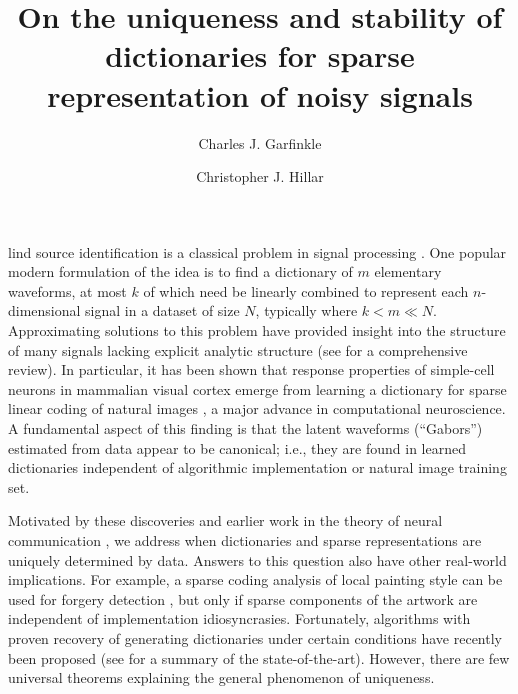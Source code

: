\documentclass[9pt,twocolumn]{pnas-new}
\title{On the uniqueness and stability of dictionaries for sparse representation of noisy signals}
\author[a,1]{Charles J. Garfinkle}
\author[a,1]{Christopher J. Hillar}
\affil[a]{Redwood Center for Theoretical Neuroscience, Berkeley, CA, USA}
\begin{document}
\verticaladjustment{-2pt}

\maketitle
\thispagestyle{firststyle}

lind source identification is a classical problem in signal processing \cite{sato1975method}.  
One popular modern formulation of the idea is to find a dictionary of $m$ elementary waveforms, at most $k$ of which need be linearly combined to represent each $n$-dimensional signal in a dataset of size $N$, typically where $k < m \ll N$.  Approximating solutions to this problem have
provided insight into the structure of many signals lacking explicit analytic structure (see \cite{Zhang15} for a comprehensive review). 
In particular, it has been shown that response properties of simple-cell neurons in mammalian visual cortex emerge from learning a dictionary for sparse linear coding of natural images \cite{Olshausen96, hurri1996image, bell1997independent, van1998independent}, a major advance in computational neuroscience. A fundamental aspect of this finding is that the latent waveforms (``Gabors'') estimated from data appear to be canonical; i.e., they are found in learned dictionaries independent of algorithmic implementation or natural image training set.


Motivated by these discoveries and earlier work in the theory of neural communication \cite{Coulter10, Isely10}, we address when dictionaries and sparse representations are uniquely determined by data.  Answers to this question also have other real-world implications.  For example, a sparse coding analysis of local painting style can be used for forgery detection \cite{hughes2010, Olshausen10}, but only if sparse components of the artwork are independent of implementation idiosyncrasies. Fortunately, algorithms with proven recovery of generating dictionaries under certain 
conditions have recently been proposed (see \cite[Sec.~I-E]{Sun16} for a summary of the state-of-the-art).  However, there are few universal theorems explaining the general phenomenon of uniqueness.  
\end{document}
